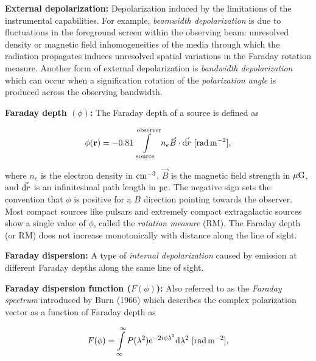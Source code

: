 \documentclass[a4paper,10pt]{article}
\begin{document}
{\noindent}\textbf{External depolarization:} Depolarization induced by the limitations of the instrumental capabilities. For example, \textit{beamwidth depolarization} is due to fluctuations in the foreground screen within the observing beam: unresolved density or magnetic field inhomogeneities of the media through which the radiation propagates induces unresolved spatial variations in the Faraday rotation measure. Another form of external depolarization is \textit{bandwidth depolarization} which can occur when a signification rotation of the \textit{polarization angle} is produced across the observing bandwidth.

{\noindent}\textbf{Faraday depth $(\phi)$:} The Faraday depth of a source is defined as

\begin{align*}
    \phi(\mathbf{r}) = -0.81 \int\limits_\mathrm{source}^\mathrm{observer}n_e\vec{B}\cdot\vec{{\rm d}r} ~ [{\rm rad\,m^{-2}}],
\end{align*}

{\noindent}where $n_e$ is the electron density in ${\rm cm^{-3}}$, $\vec{B}$ is the magnetic field strength in $\mu{\rm G}$, and $\vec{{\rm d}r}$ is an infinitesimal path length in ${\rm pc}$. The negative sign sets the convention that $\phi$ is positive for a $B$ direction pointing towards the observer. Most compact sources like pulsars and extremely compact extragalactic sources show a single value of $\phi$, called the \textit{rotation measure} (RM). The Faraday depth (or RM) does not increase monotonically with distance along the line of sight.

{\noindent}\textbf{Faraday dispersion:} A type of \textit{internal depolarization} caused by emission at different Faraday depths along the same line of sight.

{\noindent}\textbf{Faraday dispersion function ($F(\phi)$):} Also referred to as the \textit{Faraday spectrum} introduced by Burn (1966) which describes the complex polarization vector as a function of Faraday depth as

\begin{align*}
    F(\phi) = \int\limits_{\infty}^\infty P(\lambda^2)\mathrm{e}^{-2i\phi\lambda^2}\mathrm{d}\lambda^2 ~ [{\rm rad\,m^{-2}}],
\end{align*}
\end{document}
